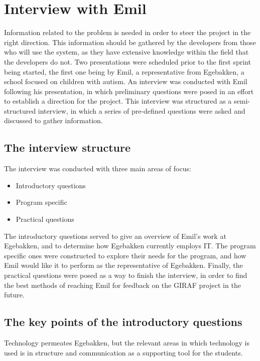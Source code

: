 \section{Interview with Emil}\label{interview-with-emil}
Information related to the problem is needed in order to steer the project in the right direction.
This information should be gathered by the developers from those who will use the system, as they have extensive knowledge within the field that the developers do not.
Two presentations were scheduled prior to the first sprint being started, the first one being by Emil, a representative from Egebakken, a school focused on children with autism.
An interview was conducted with Emil following his presentation, in which preliminary questions were posed in an effort to establish a direction for the project.
This interview was structured as a semi-structured interview, in which a series of pre-defined questions were asked and discussed to gather information.

\subsection{The interview structure}
The interview was conducted with three main areas of focus:
\begin{itemize}
    \item Introductory questions
    \item Program specific
    \item Practical questions
\end{itemize}
\noindent
The introductory questions served to give an overview of Emil's work at Egebakken, and to determine how Egebakken currently employs IT.
The program specific ones were constructed to explore their needs for the program, and how Emil would like it to perform as the representative of Egebakken.
Finally, the practical questions were posed as a way to finish the interview, in order to find the best methods of reaching Emil for feedback on the GIRAF project in the future.

\subsection{The key points of the introductory questions}
Technology permeates Egebakken, but the relevant areas in which technology is used is in structure and communication as a supporting tool for the students.

